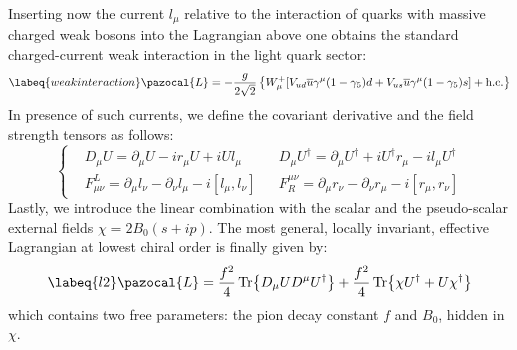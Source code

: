 \documentclass[../main.tex]{subfiles}
\begin{document}
Inserting now the current $l_\mu$ relative to the interaction of quarks with massive charged weak bosons into the Lagrangian above one obtains the standard
charged-current weak interaction in the light quark sector:
\begin{equation}
\labeq{weakinteraction}
\pazocal{L}=-\frac{g}{2\sqrt{2}}\left\{W_\mu^+[V_{ud}\overline{u}\gamma^\mu(1-\gamma_5)d+V_{us}\overline{u}\gamma^\mu(1-\gamma_5)s]+\text{h.c.}\right\}
\end{equation}
In presence of such currents, we define the covariant derivative and the field strength tensors as follows:
\[
\left\{
\begin{aligned}
&D_\mu U=\partial_\mu U-ir_\mu U+iUl_\mu &&D_\mu U^\dagger=\partial_\mu U^\dagger+iU^\dagger r_\mu-il_\mu U^\dagger\\
&F_{\mu\nu}^L=\partial_\mu l_\nu-\partial_\nu l_\mu-i[l_\mu,l_\nu] &&F^{\mu\nu}_R=\partial_\mu r_\nu-\partial_\nu r_\mu-i[r_\mu,r_\nu]
\end{aligned}
\right.
\]
Lastly, we introduce the linear combination with the scalar and the pseudo-scalar external fields $\chi=2B_0(s+ip)$. The most
general, locally invariant, effective Lagrangian at lowest chiral order is finally given by:
\begin{equation}
\labeq{l2}    
\pazocal{L}=\frac{f^2}{4}\Tr{D_\mu UD^\mu U^\dagger}+\frac{f^2}{4}\Tr{\chi U^\dagger+U\chi^\dagger} 
\end{equation}
which contains two free parameters: the pion decay constant $f$ and $B_0$, hidden in $\chi$.
\end{document}
